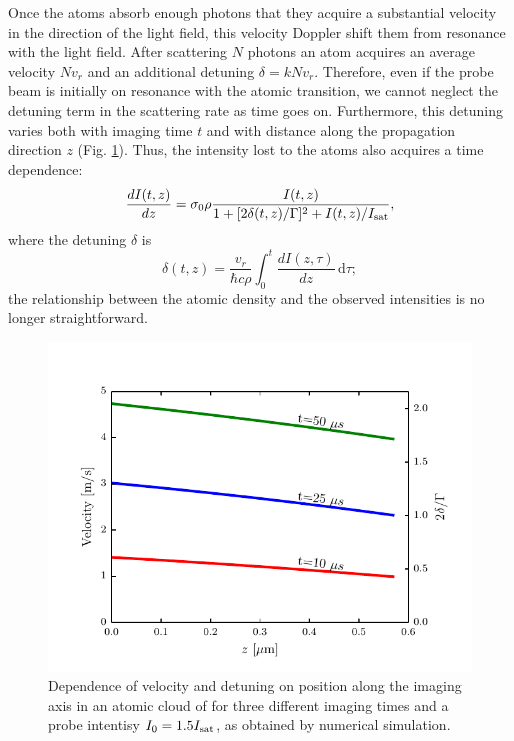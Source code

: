 \documentclass[12pt]{iopart}
\begin{document}
\par Once the atoms absorb enough photons that they acquire a substantial velocity in the direction of the light field, this velocity Doppler shift them from resonance with the light field. After scattering $N$ photons an atom acquires an average velocity $N v_r$ and an additional detuning $\delta=k N v_r$. Therefore, even if the probe beam is initially on resonance with the atomic transition, we cannot neglect the detuning term in the scattering rate as time goes on. Furthermore, this detuning varies both with imaging time $t$ and with distance along the propagation direction $z$ (Fig. \ref{fig:detunedBlobs}). Thus, the intensity lost to the atoms also acquires a time dependence: 
\begin{equation}
\frac{dI(t,z)}{dz}=\sigma_0 \rho \frac{I(t,z)}{1+[2\delta(t,z)/\Gamma]^2 +I(t,z)/I_{\rm{sat}}}, \label{eq3}
\end{equation}
where the detuning $\delta$ is
\begin{equation}
\delta(t,z)=\frac{v_r}{\hbar c \rho}\int_0^t \frac{dI(z,\tau)}{dz}\,\mathrm{d}\tau; \label{eq4} 
\end{equation}
the relationship between the atomic density and the observed intensities is no longer straightforward.
\begin{figure}
	\includegraphics*{Figure1.pdf}
\caption{Dependence of velocity and detuning on position along the imaging axis in an atomic cloud of \K{} for three different imaging times and a probe intentisy $I_0=1.5 I_{\rm{sat}}$, as obtained by numerical simulation.}  
\label{fig:detunedBlobs}
\end{figure}
\end{document}
